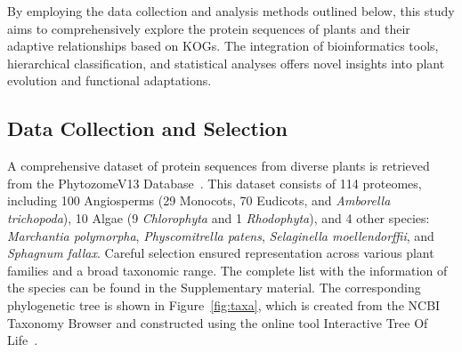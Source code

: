 By employing the data collection and analysis methods outlined 
below, this study aims to comprehensively explore the protein 
sequences of plants and their adaptive relationships based 
on KOGs. The integration of bioinformatics tools, hierarchical 
classification, and statistical analyses offers novel insights 
into plant evolution and functional adaptations.


\subsection{Data Collection and Selection}
\label{sec:method.data}

A comprehensive dataset of protein sequences from diverse plants 
is retrieved from the PhytozomeV13 Database~\citep{goodstein2011}.
This dataset consists of 114 proteomes, including 100 
Angiosperms (29 Monocots, 70 Eudicots, and \emph{Amborella 
trichopoda}), 10 Algae (9 \emph{Chlorophyta} and 1 
\emph{Rhodophyta}), and 4 other species: \emph{Marchantia 
polymorpha}, \emph{Physcomitrella patens}, \emph{Selaginella 
moellendorffii}, and \emph{Sphagnum fallax}. Careful selection 
ensured representation across various plant families and a 
broad taxonomic range. The complete list with the information 
of the species can be found in the Supplementary material. The 
corresponding phylogenetic tree is shown in 
Figure~\ref{fig:taxa}, which is created from the NCBI Taxonomy 
Browser and constructed using the online tool Interactive 
Tree Of Life~\citep{letunic2021}.

